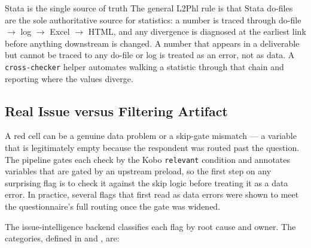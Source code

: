 \begin{notebox}{Stata is the single source of truth}
The general L2Phl rule is that Stata do-files are the sole authoritative source for statistics: a number is traced through do-file $\rightarrow$ log $\rightarrow$ Excel $\rightarrow$ HTML, and any divergence is diagnosed at the earliest link before anything downstream is changed. A number that appears in a deliverable but cannot be traced to any do-file or log is treated as an error, not as data. A \texttt{cross-checker} helper automates walking a statistic through that chain and reporting where the values diverge.
\end{notebox}

\subsection{Real Issue versus Filtering Artifact}

A red cell can be a genuine data problem or a skip-gate mismatch --- a variable that is legitimately empty because the respondent was routed past the question. The pipeline gates each check by the Kobo \texttt{relevant} condition and annotates variables that are gated by an upstream preload, so the first step on any surprising flag is to check it against the skip logic before treating it as a data error. In practice, several flags that first read as data errors were shown to meet the questionnaire's full routing once the gate was widened.

The issue-intelligence backend classifies each flag by root cause and owner. The categories, defined in  and , are:

